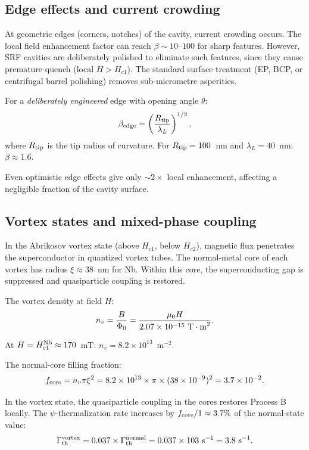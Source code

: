 \documentclass[11pt]{article}
\newcommand{\ee}[1]{\times 10^{#1}}
\begin{document}
\subsection{Edge effects and current crowding}

At geometric edges (corners, notches) of the cavity, current crowding occurs.
The local field enhancement factor can reach $\beta \sim 10$--$100$ for sharp
features. However, SRF cavities are deliberately polished to eliminate such
features, since they cause premature quench (local $H > H_{c1}$). The standard
surface treatment (EP, BCP, or centrifugal barrel polishing) removes
sub-micrometre asperities.

For a \emph{deliberately engineered} edge with opening angle $\theta$:
\begin{equation}
\beta_{\rm edge} = \left(\frac{R_{\rm tip}}{\lambda_L}\right)^{1/2},
\end{equation}
where $R_{\rm tip}$ is the tip radius of curvature. For $R_{\rm tip} = 100$~nm
and $\lambda_L = 40$~nm: $\beta \approx 1.6$.

Even optimistic edge effects give only $\sim 2\times$ local enhancement,
affecting a negligible fraction of the cavity surface.

\subsection{Vortex states and mixed-phase coupling}

In the Abrikosov vortex state (above $H_{c1}$, below $H_{c2}$), magnetic flux
penetrates the superconductor in quantized vortex tubes. The normal-metal core
of each vortex has radius $\xi \approx 38$~nm for Nb. Within this core, the
superconducting gap is suppressed and quasiparticle coupling is restored.

The vortex density at field $H$:
\begin{equation}
n_v = \frac{B}{\Phi_0} = \frac{\mu_0 H}{2.07\ee{-15}~{\rm T\cdot m}^2}.
\end{equation}

At $H = H_{c1}^{\rm Nb} \approx 170$~mT: $n_v = 8.2\ee{13}$~m$^{-2}$.

The normal-core filling fraction:
\begin{equation}
f_{\rm core} = n_v \pi \xi^2 = 8.2\ee{13} \times \pi \times (38\ee{-9})^2
= 3.7\ee{-2}.
\end{equation}

In the vortex state, the quasiparticle coupling in the cores restores
Process B locally. The $\psi$-thermalization rate increases by $f_{\rm core}/1
\approx 3.7\%$ of the normal-state value:
\begin{equation}
\Gamma_{\rm th}^{\rm vortex} = 0.037 \times \Gamma_{\rm th}^{\rm normal}
= 0.037 \times 103~{\rm s}^{-1} = 3.8~{\rm s}^{-1}.
\end{equation}
\end{document}
